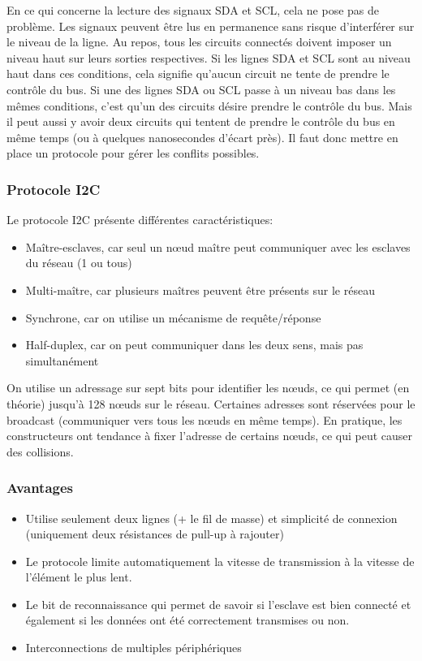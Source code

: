 \documentclass[french,a4paper,12pt]{report}
\begin{document}
En ce qui concerne la lecture des signaux SDA et SCL, cela ne pose pas de problème. Les signaux peuvent être lus en permanence sans risque d'interférer sur le niveau de la ligne.
Au repos, tous les circuits connectés doivent imposer un niveau haut sur leurs sorties respectives. Si les lignes SDA et SCL sont au niveau haut dans ces conditions, cela signifie qu'aucun circuit ne tente de prendre le contrôle du bus. Si une des lignes SDA ou SCL passe à un niveau bas dans les mêmes conditions, c'est qu'un des circuits désire prendre le contrôle du bus. Mais il peut aussi y avoir deux circuits qui tentent de prendre le contrôle du bus en même temps (ou à quelques nanosecondes d'écart près). Il faut donc mettre en place un protocole pour gérer les conflits possibles.

   		\subsubsection{Protocole I2C}
	Le protocole I2C présente différentes caractéristiques:
 
			\begin{itemize}
			\item Maître-esclaves, car seul un nœud maître peut communiquer avec les esclaves du réseau (1 ou tous)
			\item Multi-maître, car plusieurs maîtres peuvent être présents sur le réseau
			\item Synchrone, car on utilise un mécanisme de requête/réponse
			\item Half-duplex, car on peut communiquer dans les deux sens, mais pas simultanément
			\end{itemize}
 
On utilise un adressage sur sept bits pour identifier les nœuds, ce qui permet (en théorie) jusqu’à 128 nœuds sur le réseau. Certaines adresses sont réservées pour le broadcast (communiquer vers tous les nœuds en même temps). En pratique, les constructeurs ont tendance à fixer l’adresse de certains nœuds, ce qui peut causer des collisions.
 
 
  		\subsubsection{Avantages}
			\begin{itemize}
			\item Utilise seulement deux lignes (+ le fil de masse) et simplicité de connexion (uniquement deux résistances de pull-up à rajouter) 
			\item Le protocole limite automatiquement la vitesse de transmission à la vitesse de l’élément le plus lent. 
			\item Le bit de reconnaissance qui permet de savoir si l’esclave est bien connecté et également si les données ont été correctement transmises ou non. 
			\item Interconnections de multiples périphériques
			\end{itemize}
 
\end{document}
